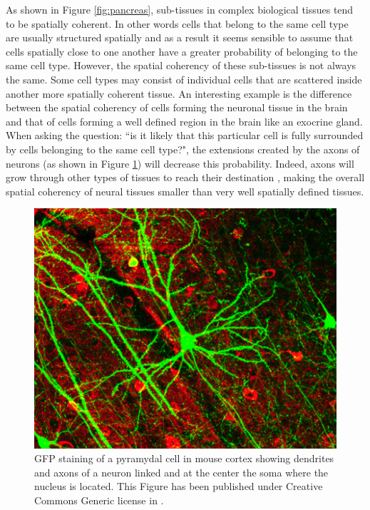      
    As shown in Figure \ref{fig:pancreas}, sub-tissues in complex biological tissues tend to be spatially coherent. In other words cells that belong to the same cell type are usually structured spatially and as a result it seems sensible to assume that cells spatially close to one another have a greater probability of belonging to the same cell type. However, the spatial coherency of these sub-tissues is not always the same. Some cell types may consist of individual cells that are scattered inside another more spatially coherent tissue. An interesting example is the difference between the spatial coherency of cells forming the neuronal tissue in the brain and that of cells forming a well defined region in the brain like an exocrine gland. When asking the question: ``is it likely that this particular cell is fully surrounded by cells belonging to the same cell type?", the extensions created by the axons of neurons (as shown in Figure \ref{fig:neuron}) will decrease this probability. Indeed, axons will grow through other types of tissues to reach their destination \cite{bartlett84,colello90}, making the overall spatial coherency of neural tissues smaller than very well spatially defined tissues.\\
    
\begin{figure}[bth]
\begin{center}
  \includegraphics[width=0.8\linewidth]{gfx/chapter1/neuron.png}
\end{center}
  \caption{GFP staining of a pyramydal cell in mouse cortex showing dendrites and axons of a neuron linked and at the center the soma where the nucleus is located. This Figure has been published under Creative Commons Generic license in \cite{lee06}.}
  \label{fig:neuron}
\end{figure}
	
